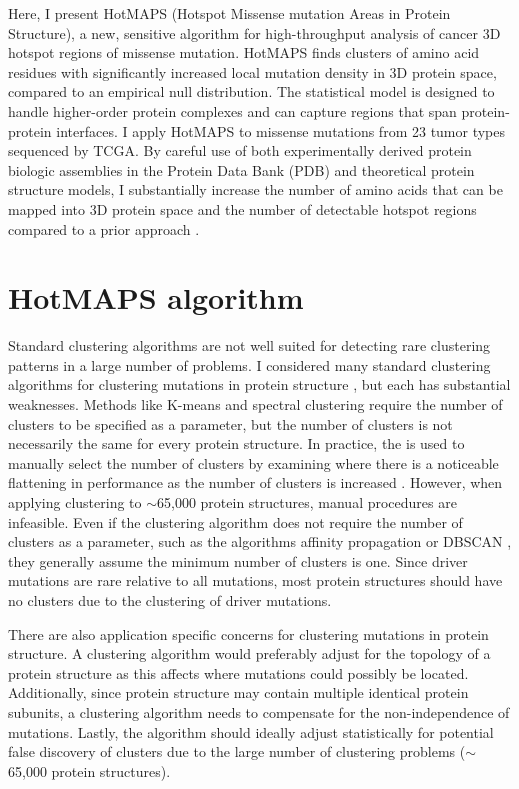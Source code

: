 Here, I present HotMAPS (Hotspot Missense mutation Areas in Protein Structure), a new, sensitive algorithm for high-throughput analysis of cancer 3D hotspot regions of missense mutation. HotMAPS finds clusters of amino acid residues with significantly increased local mutation density in 3D protein space, compared to an empirical null distribution. The statistical model is designed to handle higher-order protein complexes and can capture regions that span protein-protein interfaces. I apply HotMAPS to missense mutations from 23 tumor types sequenced by TCGA. By careful use of both experimentally derived protein biologic assemblies in the Protein Data Bank (PDB) and theoretical protein structure models, I substantially increase the number of amino acids that can be mapped into 3D protein space and the number of detectable hotspot regions compared to a prior approach \cite{RN105}.

\section{HotMAPS algorithm}

Standard clustering algorithms are not well suited for detecting rare clustering patterns in a large number of problems. I considered many standard clustering algorithms for clustering mutations in protein structure \cite{RN117, RN114, RN115, RN116}, but each has substantial weaknesses. Methods like K-means and spectral clustering require the number of clusters to be specified as a parameter, but the number of clusters is not necessarily the same for every protein structure. In practice, the  is used to manually select the number of clusters by examining where there is a noticeable flattening in performance as the number of clusters is increased \cite{RN118}. However, when applying clustering to $\sim$65,000 protein structures, manual procedures are infeasible. Even if the clustering algorithm does not require the number of clusters as a parameter, such as the algorithms affinity propagation \cite{RN114} or DBSCAN \cite{RN117}, they generally assume the minimum number of clusters is one. Since driver mutations are rare relative to all mutations, most protein structures should have no clusters due to the clustering of driver mutations.

There are also application specific concerns for clustering mutations in protein structure. A clustering algorithm would preferably adjust for the topology of a protein structure as this affects where mutations could possibly be located. Additionally, since protein structure may contain multiple identical protein subunits, a clustering algorithm needs to compensate for the non-independence of mutations. Lastly, the algorithm should ideally adjust statistically for potential false discovery of clusters due to the large number of clustering problems ($\sim$65,000 protein structures). 

